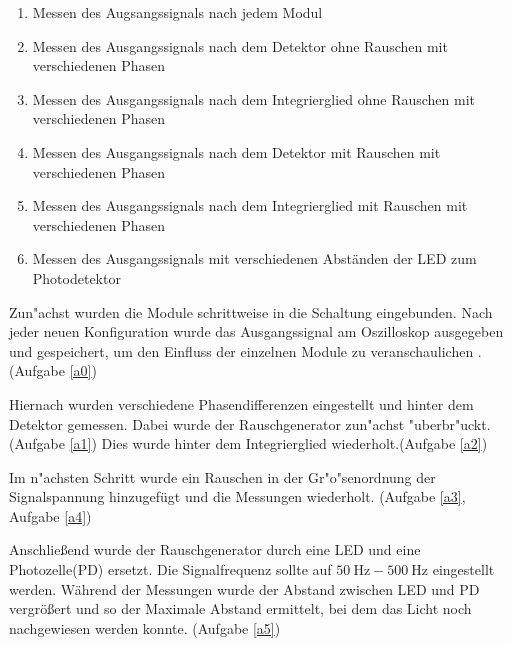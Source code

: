 \documentclass{scrartcl}
\begin{document}
\begin{enumerate}
\item \label{a0} Messen des Augsangssignals nach jedem Modul
\item \label{a1} Messen des Ausgangssignals nach dem Detektor ohne Rauschen mit verschiedenen Phasen
\item \label{a2} Messen des Ausgangssignals nach dem Integrierglied ohne Rauschen mit verschiedenen Phasen
\item \label{a3} Messen des Ausgangssignals nach dem Detektor mit Rauschen mit verschiedenen Phasen
\item \label{a4} Messen des Ausgangssignals nach dem Integrierglied mit Rauschen mit verschiedenen Phasen
\item \label{a5} Messen des Ausgangssignals mit verschiedenen Abständen der LED zum Photodetektor
\end{enumerate}

	Zun"achst wurden die Module schrittweise in die Schaltung eingebunden.
	Nach jeder neuen Konfiguration wurde das Ausgangssignal am Oszilloskop ausgegeben und gespeichert,
	um den Einfluss der einzelnen Module zu veranschaulichen . (Aufgabe \ref{a0})

	Hiernach wurden verschiedene Phasendifferenzen eingestellt und hinter dem Detektor gemessen.
	Dabei wurde der Rauschgenerator zun"achst "uberbr"uckt.(Aufgabe \ref{a1})
	Dies wurde hinter dem Integrierglied wiederholt.(Aufgabe \ref{a2})

	Im n"achsten Schritt wurde ein Rauschen in der Gr"o"senordnung der Signalspannung hinzugefügt und die Messungen
	wiederholt. (Aufgabe \ref{a3}, Aufgabe \ref{a4})

	Anschließend wurde der Rauschgenerator durch eine LED und eine Photozelle(PD) ersetzt.
	Die Signalfrequenz sollte auf $\SI{50}{\hertz}-\SI{500}{\hertz}$ eingestellt werden. 
	Während der Messungen wurde der Abstand zwischen LED und PD vergrößert und so der Maximale Abstand ermittelt,
	bei dem das Licht noch nachgewiesen werden konnte. (Aufgabe \ref{a5})
\end{document}
